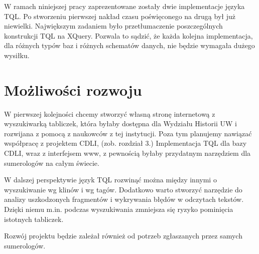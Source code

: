 W ramach niniejszej pracy zaprezentowane zostały dwie implementacje języka TQL. Po stworzeniu pierwszej nakład czasu poświęconego na drugą był już niewielki. Największym zadaniem było przetłumaczenie poszczególnych konstrukcji TQL na XQuery. Pozwala to sądzić, że każda kolejna implementacja, dla różnych typów baz i różnych schematów danych, nie będzie wymagała dużego wysiłku. 



\section*{Możliwości rozwoju}

W pierwszej kolejności chcemy stworzyć własną stronę internetową z wyszukiwarką tabliczek, która byłaby dostępna dla Wydziału Historii UW i rozwijana z pomocą z naukowców z tej instytucji. Poza tym planujemy nawiązać współpracę z projektem CDLI, (zob. rozdział 3.) Implementacja TQL dla bazy CDLI, wraz z interfejsem www, z pewnością byłaby przydatnym narzędziem dla sumerologów na całym świecie.

W dalszej perspektywie język TQL rozwinąć można między innymi o wyszukiwanie wg klinów i wg tagów. Dodatkowo warto stworzyć narzędzie do analizy uszkodzonych fragmentów i wykrywania błędów w odczytach tekstów. Dzięki niemu m.in. podczas wyszukiwania  zmniejsza się ryzyko pominięcia istotnych tabliczek. 

Rozwój projektu będzie zależał również od potrzeb zgłaszanych przez samych sumerologów.







%
%
%
